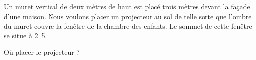 
Un muret vertical de deux mètres de haut est placé trois mètres devant la façade d'une maison. Nous voulons placer un projecteur au sol de telle sorte que l'ombre du muret couvre la fenêtre de la chambre des enfants. Le sommet de cette fenêtre se situe à \unit{2.5}{\meter}.
    
Où placer le projecteur ?

%

